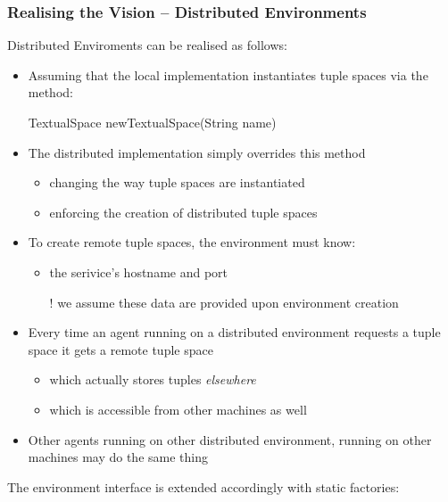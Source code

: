 \documentclass[presentation]{beamer}\mode<presentation>{\usetheme{AMSCesenaPurpleAndGold}}
\begin{document}
\begin{frame}[allowframebreaks]
	\frametitle{Realising the Vision -- Distributed Environments}

	Distributed Enviroments can be realised as follows:
	

	\framebreak

	\begin{itemize}
		\item Assuming that the local implementation \alert{instantiates} tuple spaces via the method:
		\begin{center}\ttfamily
			TextualSpace newTextualSpace(String name)
		\end{center}

		\smallskip
	
		\item The \alert{distributed} implementation simply overrides this method
		\begin{itemize}
			\item changing the way tuple spaces are instantiated
			\item enforcing the creation of \alert{distributed} tuple spaces
		\end{itemize}

		\smallskip

		\item To create remote tuple spaces, the environment must know:
		\begin{itemize}
			\item the \linda{} serivice's hostname and port
			\item[!] we assume these data are provided upon environment creation 
		\end{itemize}

		\smallskip

		\item Every time an agent running on a distributed environment requests a tuple space it gets a \alert{remote} tuple space
		\begin{itemize}
			\item which actually stores tuples \emph{elsewhere}
			\item which is accessible from other machines as well
		\end{itemize}

		\smallskip

		\item Other agents running on other distributed environment, running on other machines may do the same thing
	\end{itemize}

	\framebreak

	The environment interface is extended accordingly with static factories:
	
\end{frame}
\end{document}

